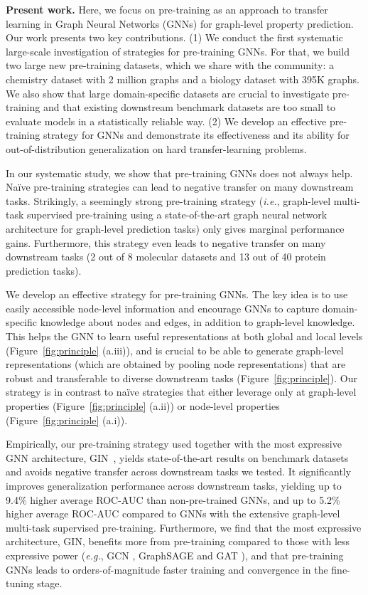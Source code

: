\documentclass{article} \usepackage{iclr2020_conference,times}
\numberwithin{equation}{section}
\theoremstyle{plain}
\theoremstyle{definition}
\theoremstyle{remark}
\newcommand{\ie}{\textit{i.e.}}
\newcommand{\eg}{\textit{e.g.}}
\begin{document}
{\bf Present work.}
Here, we focus on pre-training as an approach to transfer learning in Graph Neural Networks (GNNs) \citep{kipf2016semi,hamilton2017inductive,ying2018hierarchical,xu2018how,xu2018representation} for graph-level property prediction. Our work presents two key contributions. (1) We conduct the first systematic large-scale investigation of strategies for pre-training GNNs. For that, we build two large new pre-training datasets, which we share with the community: a chemistry dataset with 2 million graphs and a biology dataset with 395K graphs. We also show that large domain-specific datasets are crucial to investigate pre-training and that existing downstream benchmark datasets are too small to evaluate models in a statistically reliable way. (2) We develop an effective pre-training strategy for GNNs and demonstrate its effectiveness and its ability for out-of-distribution generalization on hard transfer-learning problems.

In our systematic study, we show that pre-training GNNs does not always help. Na\"ive pre-training strategies can lead to negative transfer on many downstream tasks. Strikingly, a seemingly strong pre-training strategy (\ie, graph-level multi-task supervised pre-training using a state-of-the-art graph neural network architecture for graph-level prediction tasks) only gives marginal performance gains. Furthermore, this strategy even leads to negative transfer on many downstream tasks (2 out of 8 molecular datasets and 13 out of 40 protein prediction tasks). 

We develop an effective strategy for pre-training GNNs. The key idea is to use easily accessible node-level information and encourage GNNs to capture domain-specific knowledge about nodes and edges, in addition to graph-level knowledge.
This helps the GNN to learn useful representations at both global and local levels (Figure~\ref{fig:principle} (a.iii)), and is crucial to be able to generate graph-level representations (which are obtained by pooling node representations) that are robust and transferable to diverse downstream tasks (Figure~\ref{fig:principle}).
Our strategy is in contrast to na\"ive strategies that either leverage only at graph-level properties (Figure~\ref{fig:principle} (a.ii)) or node-level properties (Figure~\ref{fig:principle} (a.i)).

Empirically, our pre-training strategy used together with the most expressive GNN architecture, GIN~\citep{xu2018how}, yields state-of-the-art results on benchmark datasets and avoids negative transfer across downstream tasks we tested. It significantly improves generalization performance across downstream tasks, yielding up to 9.4\% higher average ROC-AUC than non-pre-trained GNNs, and up to 5.2\% higher average ROC-AUC compared to GNNs with the extensive graph-level multi-task supervised pre-training.
Furthermore, we find that the most expressive architecture, GIN, benefits more from pre-training compared to those with less expressive power (\eg, GCN \citep{kipf2016semi}, GraphSAGE \citep{hamilton2017representation} and GAT \citep{velivckovic2017graph}), and that pre-training GNNs leads to orders-of-magnitude faster training and convergence in the fine-tuning stage.
\end{document}
